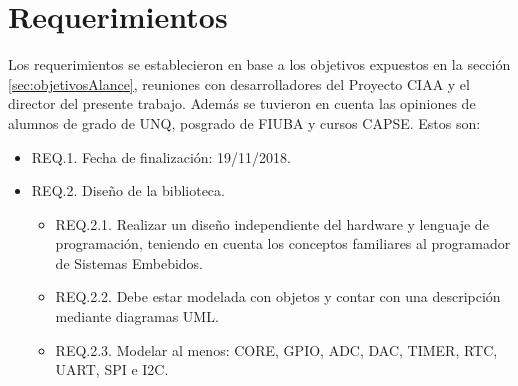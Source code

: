 \section{Requerimientos}
\label{sec:requerimientos}

Los requerimientos se establecieron en base a los objetivos expuestos en la sección \ref{sec:objetivosAlance}, reuniones con desarrolladores del Proyecto CIAA y el director del presente trabajo. Además se tuvieron en cuenta las opiniones de alumnos de grado de UNQ, posgrado de FIUBA y cursos CAPSE. Estos son:

\begin{itemize} %
\item REQ.1. Fecha de finalización: 19/11/2018.
\item REQ.2. Diseño de la biblioteca.
\begin{itemize}%
\item REQ.2.1. Realizar un diseño independiente del hardware y lenguaje de programación, teniendo en cuenta los conceptos familiares al programador de Sistemas Embebidos.
\item REQ.2.2. Debe estar modelada con objetos y contar con una descripción mediante diagramas UML.
\item REQ.2.3. Modelar al menos: CORE, GPIO, ADC, DAC, TIMER, RTC, UART, SPI e I2C.
\end{itemize}

\end{itemize}
